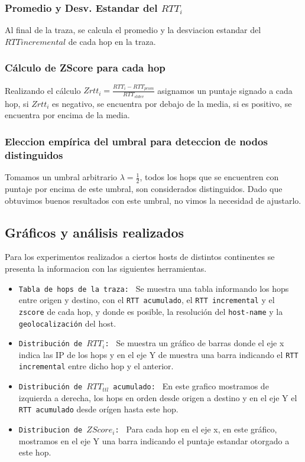 \subsubsection{Promedio y Desv. Estandar del $RTT_i$}
Al final de la traza, se calcula el promedio y la desviacion estandar del $RTT incremental$ de cada hop en la traza.
\subsubsection{Cálculo de ZScore para cada hop}
Realizando el cálculo $Zrtt_i = \frac{RTT_i - RTT_{prom}}{RTT_{stdev}}$ asignamos un puntaje signado a cada hop, si $Zrtt_i$ es negativo, se encuentra por debajo de la media, si es positivo, se encuentra por encima de la media.

\subsubsection{Eleccion emp\'irica del umbral para deteccion de nodos distinguidos}
Tomamos un umbral arbitrario $\lambda=\frac{1}{2}$, todos los hops que se encuentren con puntaje por encima de este umbral, son considerados distinguidos. Dado que obtuvimos buenos resultados con este umbral, no vimos la necesidad de ajustarlo.

\subsection{Gr\'aficos y an\'alisis realizados}
Para los experimentos realizados a ciertos hosts de distintos continentes se presenta la informacion con las siguientes herramientas.
\begin{itemize}
	\item \texttt{Tabla de hops de la traza: }
	Se muestra una tabla informando los hops entre origen y destino, con el \texttt{RTT acumulado}, el \texttt{RTT incremental} y el \texttt{zscore} de cada hop, y donde es posible, la resolución del \texttt{host-name} y la \texttt{geolocalización} del host.

	\item \texttt{Distribución de $RTT_i$: }
		Se muestra un gráfico de barras donde el eje x indica las IP de los hops y en el eje Y de muestra una barra indicando el \texttt{RTT incremental} entre dicho hop y el anterior.
	\item \texttt{Distribución de $RTT_{ttl}$ acumulado: }
		En este grafico mostramos de izquierda a derecha, los hops en orden desde origen a destino y en el eje Y el \texttt{RTT acumulado} desde orígen hasta este hop.
	\item \texttt{Distribucion de $ZScore_i$: }
		Para cada hop en el eje x, en este gráfico, mostramos en el eje Y una barra indicando el puntaje estandar otorgado a este hop.
\end{itemize}

